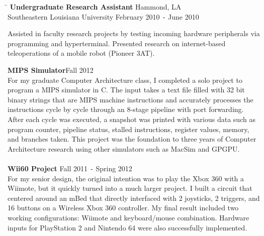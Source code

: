 \documentclass{res}
\begin{document}
\begin{resume}
	\vspace{-0.2in}
	\begin{tabbing}
		\hspace{4.35in}\= \kill %
		{\bf Undergraduate Research Assistant} \>\hspace{0.75in}Hammond, LA\\
		Southeastern Louisiana University \hspace{2.2in} February 2010 \texttt{-} June 2010
		
	\end{tabbing}\vspace{-20pt}
	\vspace{8pt}Assisted in faculty research projects by testing incoming hardware peripherals via programming and hyperterminal. Presented research on internet-based teleoperations of a mobile robot (Pioneer 3AT).
	
	{\bf MIPS Simulator}\hfill Fall 2012\\
	For my graduate Computer Architecture class, I completed a solo project to program a MIPS simulator in C. The input takes a text file filled with 32 bit binary strings that are MIPS machine instructions and accurately processes the instructions cycle by cycle through an 8-stage pipeline with port forwarding. After each cycle was executed, a snapshot was printed with various data such as program counter, pipeline status, stalled instructions, register values, memory, and branches taken. This project was the foundation to three years of Computer Architecture research using other simulators such as MacSim and GPGPU.\\\\
	{\bf Wii60 Project} \hfill Fall 2011 \texttt{-} Spring 2012 \\
	For my senior design, the original intention was to play the Xbox 360 with a Wiimote, but it quickly turned into a much larger project. I built a circuit that centered around an mBed that directly interfaced with 2 joysticks, 2 triggers, and 16 buttons on a Wireless Xbox 360 controller. My final result included two working configurations: Wiimote and keyboard/mouse combination. Hardware inputs for PlayStation 2 and Nintendo 64 were also successfully implemented.
	

\end{resume}
\end{document}
